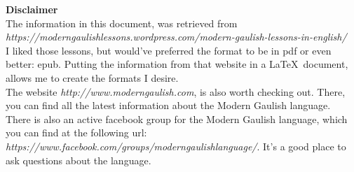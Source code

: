 \begin{center}
\textbf{Disclaimer}\\
\bigskip
\noindent The information in this document, was retrieved from \textit{https://moderngaulishlessons.wordpress.com/modern-gaulish-lessons-in-english/}\\
\bigskip
\noindent I liked those lessons, but would've preferred the format to be in pdf or even better: epub. Putting the information from that website in a \LaTeX\ document, allows me to create the formats I desire.\\
\bigskip
\noindent The website \textit{http://www.moderngaulish.com}, is also worth checking out. There, you can find all the latest information about the Modern Gaulish language.\\
\bigskip
\noindent There is also an active facebook group for the Modern Gaulish language, which you can find at the following url: \textit{https://www.facebook.com/groups/moderngaulishlanguage/}. It's a good place to ask questions about the language.
\end{center}
